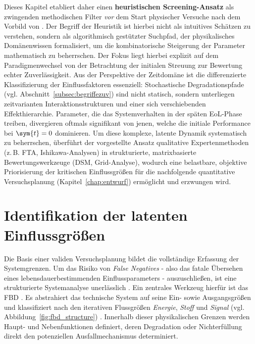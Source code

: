 Dieses Kapitel etabliert daher einen \textbf{heuristischen Screening-Ansatz} als zwingenden methodischen Filter \textit{vor} dem Start physischer Versuche nach dem Vorbild von \textcite{Arndt.2023c}.
Der Begriff der Heuristik ist hierbei nicht als intuitives Schätzen zu verstehen, sondern als algorithmisch gestützter Suchpfad, der physikalisches Domänenwissen formalisiert, um die kombinatorische Steigerung der Parameter mathematisch zu beherrschen.
Der Fokus liegt hierbei explizit auf dem Paradigmenwechsel von der Betrachtung der initialen Streuung zur Bewertung echter Zuverlässigkeit.
Aus der Perspektive der Zeitdomäne ist die differenzierte Klassifizierung der Einflussfaktoren essenziell:
Stochastische Degradationspfade (vgl. Abschnitt~\ref{subsec:begriffezuv}) sind nicht statisch, sondern unterliegen zeitvarianten Interaktionsstrukturen und einer sich verschiebenden Effekthierarchie.
Parameter, die das Systemverhalten in der späten \ac{EoL}-Phase treiben, divergieren oftmals signifikant von jenen, welche die initiale Performance bei $\sym{t}=0$ dominieren.
Um diese komplexe, latente Dynamik systematisch zu beherrschen, überführt der vorgestellte Ansatz qualitative Expertenmethoden (z.\,B. \ac{FTA}, Ishikawa-Analysen) in strukturierte, matrixbasierte Bewertungswerkzeuge (\ac{DSM}, Grid-Analyse), wodurch eine belastbare, objektive Priorisierung der kritischen Einflussgrößen für die nachfolgende quantitative Versuchsplanung (Kapitel~\ref{chap:entwurf}) ermöglicht und erzwungen wird.

\section{Identifikation der latenten Einflussgrößen} \label{sec:screening_identifikation}

Die Basis einer validen Versuchsplanung bildet die vollständige Erfassung der Systemgrenzen.
Um das Risiko von \textit{False Negatives} - also das fatale Übersehen eines lebensdauerbestimmenden Einflussparameters - auszuschließen, ist eine strukturierte Systemanalyse unerlässlich \cite{Bertsche.2022}.
Ein zentrales Werkzeug hierfür ist das \ac{FBD} \cite{Lindemann.2008,Krallmann.2013,Gundlach.2004}.
Es abstrahiert das technische System auf seine Ein- sowie Ausgangsgrößen und klassifiziert nach den iterativen Flussgrößen \textit{Energie}, \textit{Stoff} und \textit{Signal} (vgl. Abbildung~\ref{fig:fbd_structure}) \cite{Pahl.2007}.
Innerhalb dieser physikalischen Grenzen werden Haupt- und Nebenfunktionen definiert, deren Degradation oder Nichterfüllung direkt den potenziellen Ausfallmechanismus determiniert.


